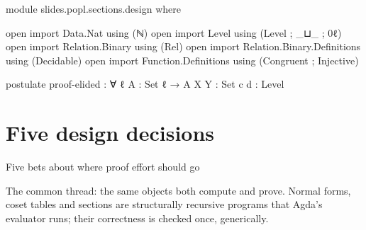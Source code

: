 \begin{code}[hide]
module slides.popl.sections.design where

open import Data.Nat using (ℕ)
open import Level using (Level ; _⊔_ ; 0ℓ)
open import Relation.Binary using (Rel)
open import Relation.Binary.Definitions using (Decidable)
open import Function.Definitions using (Congruent ; Injective)

postulate
  proof-elided : ∀ {ℓ} {A : Set ℓ} → A
  X Y          : Set
  c d          : Level
\end{code}
\section{Five design decisions}

\begin{frame}{Five bets about where proof effort should go}
\centering
{}

\vspace{14pt}
\begin{idea}
\small The common thread: \alert{the same objects both compute and prove}. Normal forms,
coset tables and sections are structurally recursive programs that Agda's evaluator
runs; their correctness is checked once, generically.
\end{idea}
\end{frame}

